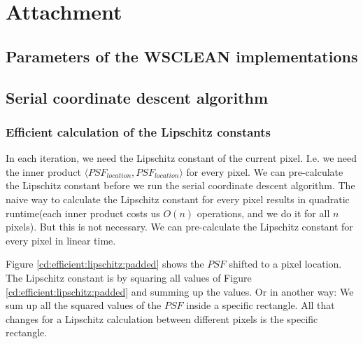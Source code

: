 \pagebreak
\section*{Attachment}

\subsection{Parameters of the WSCLEAN implementations}


\subsection{Serial coordinate descent algorithm}

\subsubsection{Efficient calculation of the Lipschitz constants}
In each iteration, we need the Lipschitz constant of the current pixel. I.e. we need the inner product $\langle PSF_{location}, PSF_{location} \rangle$ for every pixel. We can pre-calculate the Lipschitz constant before we run the serial coordinate descent algorithm. The naive way to calculate the Lipschitz constant for every pixel results in quadratic runtime(each inner product costs us $O(n)$ operations, and we do it for all $n$ pixels). But this is not necessary. We can pre-calculate the Lipschitz constant for every pixel in linear time.

Figure \ref{cd:efficient:lipschitz:padded} shows the $PSF$ shifted to a pixel location. The Lipschitz constant is by squaring all values of Figure \ref{cd:efficient:lipschitz:padded} and summing up the values. Or in another way: We sum up all the squared values of the $PSF$ inside a specific rectangle. All that changes for a Lipschitz calculation between different pixels is the specific rectangle.


